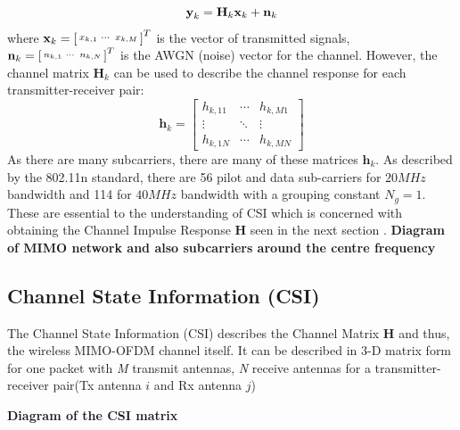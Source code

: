 \vspace{-11pt}
\begin{equation}\label{eqn:2.2}
    \textbf{y}_k = \textbf{H}_k\textbf{x}_k+\textbf{n}_k
    \vspace{-11pt}
\end{equation}
where $\textbf{x}_k = \begin{bsmallmatrix}x_{k,1} & \cdots & x_{k,M}\end{bsmallmatrix}^T$ is the vector of transmitted signals, $\textbf{n}_k = \begin{bsmallmatrix}n_{k,1} & \cdots & n_{k,N}\end{bsmallmatrix}^T$ is the AWGN (noise) vector for the channel. However, the channel matrix $\textbf{H}_{k}$ can be used to describe the channel response for each transmitter-receiver pair: 
\vspace{-11pt}
\begin{equation}\label{eqn:2.3}
\textbf{h}_{k}=\left[
\begin{array}{ccc}
    h_{k,11} & \cdots & h_{k,M1} \\
   \vdots & \ddots & \vdots \\
    h_{k,1N} & \cdots & h_{k,MN}
\end{array}
\right]
\end{equation}
As there are many subcarriers, there are many of these matrices $\textbf{h}_{k}$. As described by the 802.11n standard, there are 56 pilot and data sub-carriers for $20MHz$ bandwidth and 114 for $40MHz$ bandwidth with a grouping constant $N_g = 1$. These are essential to the understanding of CSI which is concerned with obtaining the Channel Impulse Response \textbf{H} seen in the next section \citep{full802.11nStandard}.
\textbf{Diagram of MIMO network and also subcarriers around the centre frequency}

\subsection{Channel State Information (CSI)}
The Channel State Information (CSI) describes the Channel Matrix \textbf{H} and thus, the wireless MIMO-OFDM channel itself. It can be described in 3-D matrix form for one packet with \textit{M} transmit antennas, \textit{N} receive antennas for a transmitter-receiver pair(Tx antenna $i$ and Rx antenna $j$)

\textbf{Diagram of the CSI matrix}

